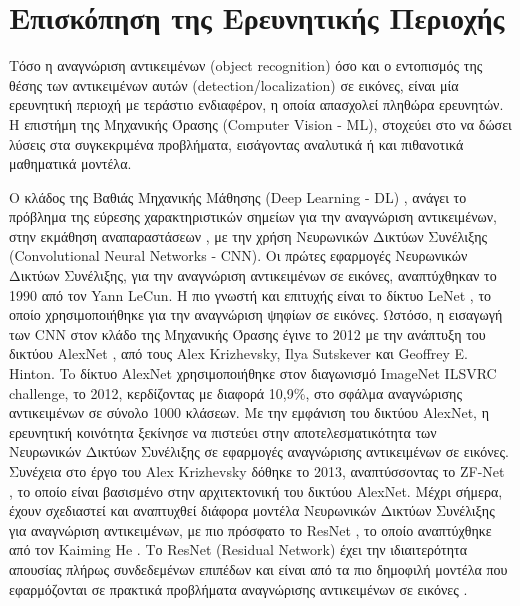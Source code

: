 \chapter{Επισκόπηση της Ερευνητικής Περιοχής}
\label{chapter:sota}
Τόσο η αναγνώριση αντικειμένων (object recognition) όσο και ο εντοπισμός
της θέσης των αντικειμένων αυτών (detection/localization) σε εικόνες,
είναι μία ερευνητική περιοχή με τεράστιο ενδιαφέρον,
η οποία απασχολεί πληθώρα ερευνητών. Η επιστήμη της Μηχανικής Όρασης (Computer Vision - ML), %
στοχεύει στο να δώσει λύσεις στα συγκεκριμένα προβλήματα, εισάγοντας αναλυτικά
ή και πιθανοτικά μαθηματικά μοντέλα.

Ο κλάδος της Βαθιάς Μηχανικής Μάθησης (Deep Learning - DL) \cite{Goodfellow-et-al-2016-Book},
ανάγει το πρόβλημα της εύρεσης χαρακτηριστικών σημείων για την αναγνώριση αντικειμένων,
στην εκμάθηση αναπαραστάσεων \cite{bengio2013representation},
με την χρήση Νευρωνικών Δικτύων Συνέλιξης (Convolutional Neural Networks - CNN). %
Οι πρώτες εφαρμογές Νευρωνικών Δικτύων Συνέλιξης, για την αναγνώριση αντικειμένων
σε εικόνες, αναπτύχθηκαν το 1990 από τον Yann LeCun.
Η πιο γνωστή και επιτυχής είναι το δίκτυο LeNet \cite{lecun1998gradient}, το οποίο
χρησιμοποιήθηκε για την αναγνώριση ψηφίων σε εικόνες.
Ωστόσο, η εισαγωγή των CNN στον κλάδο της Μηχανικής Όρασης έγινε το 2012 με
την ανάπτυξη του δικτύου AlexNet \cite{NIPS2012_4824}, από τους Alex Krizhevsky,
Ilya Sutskever και Geoffrey E. Hinton. To δίκτυο AlexNet χρησιμοποιήθηκε
στον διαγωνισμό ImageNet ILSVRC challenge, το 2012, κερδίζοντας με διαφορά
10,9\%, στο σφάλμα αναγνώρισης αντικειμένων σε σύνολο 1000 κλάσεων.
Με την εμφάνιση του δικτύου AlexNet, η ερευνητική κοινότητα ξεκίνησε να
πιστεύει στην αποτελεσματικότητα των Νευρωνικών Δικτύων Συνέλιξης σε εφαρμογές αναγνώρισης
αντικειμένων σε εικόνες. Συνέχεια στο έργο του Alex Krizhevsky δόθηκε το 2013, 
αναπτύσσοντας το ZF-Net \cite{DBLP:journals/corr/ZeilerF13}, το οποίο είναι
βασισμένο στην αρχιτεκτονική του δικτύου AlexNet. Μέχρι σήμερα, έχουν σχεδιαστεί
και αναπτυχθεί διάφορα μοντέλα Νευρωνικών Δικτύων Συνέλιξης για
αναγνώριση αντικειμένων, με πιο πρόσφατο το ResNet ,
το οποίο αναπτύχθηκε από τον Kaiming He \cite{DBLP:journals/corr/HeZRS15}. 
Το ResNet (Residual Network) έχει την
ιδιαιτερότητα απουσίας πλήρως συνδεδεμένων επιπέδων και είναι από τα πιο δημοφιλή
μοντέλα που εφαρμόζονται σε πρακτικά προβλήματα αναγνώρισης αντικειμένων σε
εικόνες \cite{DBLP:journals/corr/HeZR016}.

